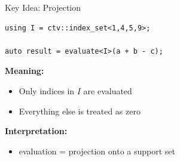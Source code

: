 \documentclass{beamer}
\begin{document}

\begin{frame}[fragile]{Key Idea: Projection}

\begin{lstlisting}
using I = ctv::index_set<1,4,5,9>;

auto result = evaluate<I>(a + b - c);
\end{lstlisting}

\vspace{1em}

\textbf{Meaning:}

\begin{itemize}
\item Only indices in $I$ are evaluated
\item Everything else is treated as zero
\end{itemize}

\vspace{1em}

\textbf{Interpretation:}
\begin{itemize}
\item evaluation = projection onto a support set
\end{itemize}

\end{frame}

\end{document}
